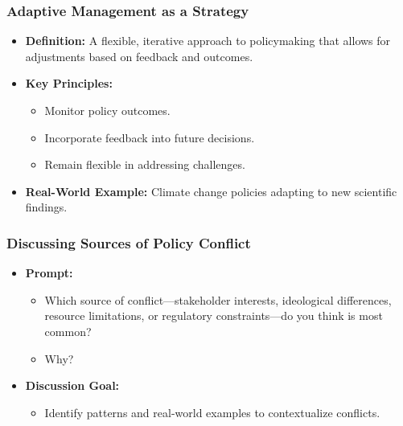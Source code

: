 \documentclass[10pt]{beamer}
\begin{document}
        \begin{frame}
            \frametitle{Adaptive Management as a Strategy}
            \begin{itemize}
                \item \textbf{Definition:} A flexible, iterative approach to policymaking that allows for adjustments based on feedback and outcomes.
                \item \textbf{Key Principles:}
                    \begin{itemize}
                        \item Monitor policy outcomes.
                        \item Incorporate feedback into future decisions.
                        \item Remain flexible in addressing challenges.
                    \end{itemize}
                \item \textbf{Real-World Example:} Climate change policies adapting to new scientific findings.
            \end{itemize}
            \end{frame}
            
            
            \begin{frame}
            \frametitle{Discussing Sources of Policy Conflict}
            \begin{itemize}
                \item \textbf{Prompt:}
                    \begin{itemize}
                        \item Which source of conflict—stakeholder interests, ideological differences, resource limitations, or regulatory constraints—do you think is most common?
                        \item Why?
                    \end{itemize}
                \item \textbf{Discussion Goal:}
                    \begin{itemize}
                        \item Identify patterns and real-world examples to contextualize conflicts.
                    \end{itemize}
            \end{itemize}
            
            \end{frame}
\end{document}
